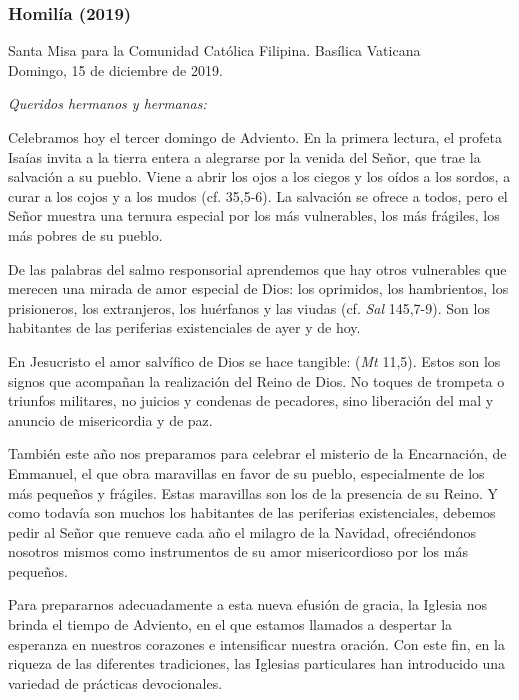 \begin{body}
\begin{body}
\subsubsection{Homilía (2019)}

Santa Misa para la Comunidad Católica Filipina. Basílica Vaticana\\ Domingo, 15 de diciembre de 2019.





\emph{Queridos hermanos y hermanas:}

Celebramos hoy el tercer domingo de Adviento. En la primera lectura, el profeta Isaías invita a la tierra entera a alegrarse por la venida del Señor, que trae la salvación a su pueblo. Viene a abrir los ojos a los ciegos y los oídos a los sordos, a curar a los cojos y a los mudos (cf. 35,5-6). La salvación se ofrece a todos, pero el Señor muestra una ternura especial por los más vulnerables, los más frágiles, los más pobres de su pueblo.

De las palabras del salmo responsorial aprendemos que hay otros vulnerables que merecen una mirada de amor especial de Dios: los oprimidos, los hambrientos, los prisioneros, los extranjeros, los huérfanos y las viudas (cf. \emph{Sal} 145,7-9). Son los habitantes de las periferias existenciales de ayer y de hoy.

En Jesucristo el amor salvífico de Dios se hace tangible:  (\emph{Mt} 11,5). Estos son los signos que acompañan la realización del Reino de Dios. No toques de trompeta o triunfos militares, no juicios y condenas de pecadores, sino liberación del mal y anuncio de misericordia y de paz.

También este año nos preparamos para celebrar el misterio de la Encarnación, de Emmanuel, el  que obra maravillas en favor de su pueblo, especialmente de los más pequeños y frágiles. Estas maravillas son los  de la presencia de su Reino. Y como todavía son muchos los habitantes de las periferias existenciales, debemos pedir al Señor que renueve cada año el milagro de la Navidad, ofreciéndonos nosotros mismos como instrumentos de su amor misericordioso por los más pequeños.

Para prepararnos adecuadamente a esta nueva efusión de gracia, la Iglesia nos brinda el tiempo de Adviento, en el que estamos llamados a despertar la esperanza en nuestros corazones e intensificar nuestra oración. Con este fin, en la riqueza de las diferentes tradiciones, las Iglesias particulares han introducido una variedad de prácticas devocionales.


\end{body}
\end{body}
